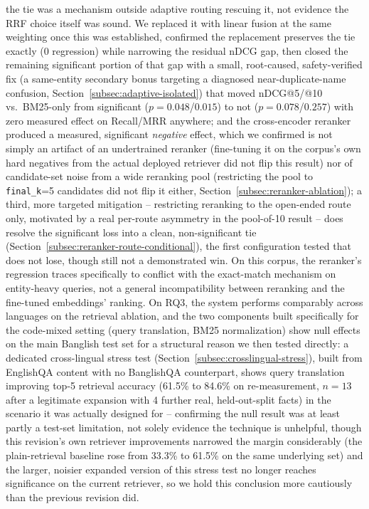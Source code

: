 \documentclass[a4paper,twoside]{article}
\begin{document}
the tie was a mechanism outside adaptive routing rescuing it, not evidence the RRF choice itself was sound. We replaced it with linear fusion at the same weighting once this was established, confirmed the replacement preserves the tie exactly (0 regression) while narrowing the residual nDCG gap, then closed the remaining significant portion of that gap with a small, root-caused, safety-verified fix (a same-entity secondary bonus targeting a diagnosed near-duplicate-name confusion, Section~\ref{subsec:adaptive-isolated}) that moved nDCG@5/@10 vs.\ BM25-only from significant ($p=0.048$/$0.015$) to not ($p=0.078$/$0.257$) with zero measured effect on Recall/MRR anywhere; and the cross-encoder reranker produced a measured, significant \emph{negative} effect, which we confirmed is not simply an artifact of an undertrained reranker (fine-tuning it on the corpus's own hard negatives from the actual deployed retriever did not flip this result) nor of candidate-set noise from a wide reranking pool (restricting the pool to \texttt{final\_k}=5 candidates did not flip it either, Section~\ref{subsec:reranker-ablation}); a third, more targeted mitigation -- restricting reranking to the open-ended route only, motivated by a real per-route asymmetry in the pool-of-10 result -- does resolve the significant loss into a clean, non-significant tie (Section~\ref{subsec:reranker-route-conditional}), the first configuration tested that does not lose, though still not a demonstrated win. On this corpus, the reranker's regression traces specifically to conflict with the exact-match mechanism on entity-heavy queries, not a general incompatibility between reranking and the fine-tuned embeddings' ranking. On RQ3, the system performs comparably across languages on the retrieval ablation, and the two components built specifically for the code-mixed setting (query translation, BM25 normalization) show null effects on the main Banglish test set for a structural reason we then tested directly: a dedicated cross-lingual stress test (Section~\ref{subsec:crosslingual-stress}), built from EnglishQA content with no BanglishQA counterpart, shows query translation improving top-5 retrieval accuracy (61.5\% to 84.6\% on re-measurement, $n=13$ after a legitimate expansion with 4 further real, held-out-split facts) in the scenario it was actually designed for -- confirming the null result was at least partly a test-set limitation, not solely evidence the technique is unhelpful, though this revision's own retriever improvements narrowed the margin considerably (the plain-retrieval baseline rose from 33.3\% to 61.5\% on the same underlying set) and the larger, noisier expanded version of this stress test no longer reaches significance on the current retriever, so we hold this conclusion more cautiously than the previous revision did.
\end{document}
